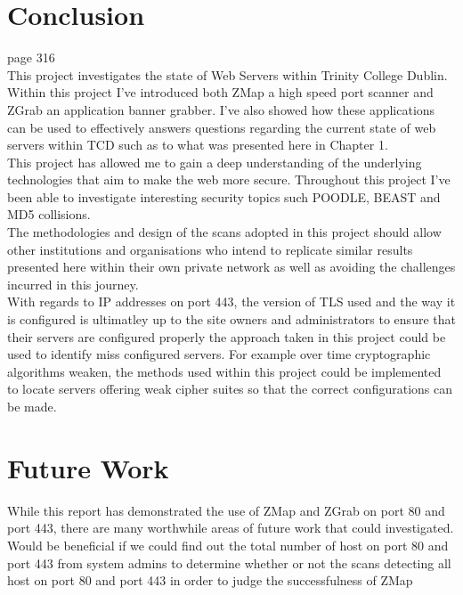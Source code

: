 \documentclass[a4wide,leqno,12pt]{report}
\begin{document}
\chapter{Conclusion}

\cite{mendes2008assessing} page 316\\

This project investigates the state of Web Servers within Trinity College Dublin. 
Within this project I’ve introduced both ZMap a high speed port scanner and ZGrab an application banner grabber. I’ve also showed how these applications can be used to effectively answers questions regarding the current state of web servers within TCD such as to what was presented here in Chapter 1.\\

This project has allowed me to gain a deep understanding of the underlying technologies that aim to make the web more secure. Throughout this project I've been able to investigate interesting security topics such POODLE, BEAST and MD5 collisions.\\

The methodologies and design of the scans adopted in this project should allow other institutions and organisations who intend to replicate similar results presented here within their own private network as well as avoiding the challenges incurred in this journey.\\

With regards to IP addresses on port 443, the version of TLS used and the way it is configured is ultimatley up to the site owners and administrators to ensure that their servers are configured properly the approach taken in this project could be used to identify miss configured servers. For example over time cryptographic algorithms weaken, the methods used within this project could be implemented to locate servers offering weak cipher suites so that the correct configurations can be made. 

\chapter{Future Work}
While this report has demonstrated the use of ZMap and ZGrab on port 80 and port 443, there are many worthwhile areas of future work that could investigated.\\

Would be beneficial if we could find out the total number of host on port 80 and port 443 from system admins to determine whether or not the scans detecting all host on port 80 and port 443 in order to judge the successfulness of ZMap\\
\end{document}
